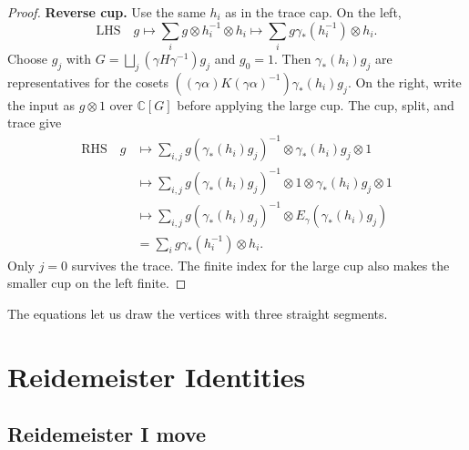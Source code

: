 \documentclass[11pt,a4paper]{article}
\numberwithin{equation}{section}
\theoremstyle{definition}
\newcommand{\C}{\mathbb C}
\begin{document}
\begin{proof}
\textbf{Reverse cup.}
Use the same \(h_i\) as in the trace cap. On the left,
\[
\text{LHS}\quad g
 \longmapsto \sum_i g\otimes h_i^{-1}\otimes h_i
 \longmapsto \sum_i g\gamma_*(h_i^{-1})\otimes h_i.
\]
Choose \(g_j\) with \(G=\bigsqcup_j(\gamma H\gamma^{-1})g_j\) and
\(g_0=1\). Then \(\gamma_*(h_i)g_j\) are representatives for
the cosets \(((\gamma\alpha)K(\gamma\alpha)^{-1})\gamma_*(h_i)g_j\).
On the right, write the input as \(g\otimes1\) over \(\C[G]\)
before applying the large cup. The cup, split, and trace give
\[
\begin{aligned}
\text{RHS}\quad g
 &\longmapsto \sum_{i,j}
     g(\gamma_*(h_i)g_j)^{-1}\otimes\gamma_*(h_i)g_j\otimes1\\
 &\longmapsto \sum_{i,j}
     g(\gamma_*(h_i)g_j)^{-1}\otimes1\otimes\gamma_*(h_i)g_j\otimes1\\
 &\longmapsto \sum_{i,j}
     g(\gamma_*(h_i)g_j)^{-1}\otimes E_\gamma(\gamma_*(h_i)g_j)\\
 &=\sum_i g\gamma_*(h_i^{-1})\otimes h_i.
\end{aligned}
\]
Only \(j=0\) survives the trace. The finite index for the large cup
also makes the smaller cup on the left finite.
\end{proof}

The equations let us draw the vertices with three straight segments.

\begin{center}
\end{center}

\section{Reidemeister Identities}\label{sec:reidemeister-identities}

\subsection{Reidemeister I move}\label{sec:reidemeister-one}
\end{document}

